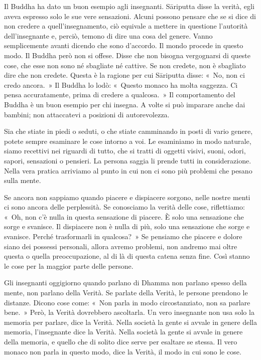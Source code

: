 Il Buddha ha dato un buon esempio agli insegnanti. Sāriputta disse la
verità, egli aveva espresso solo le sue vere sensazioni. Alcuni possono
pensare che se si dice di non credere a quell'insegnamento, ciò equivale
a mettere in questione l'autorità dell'insegnante e, perciò, temono di
dire una cosa del genere. Vanno semplicemente avanti dicendo che sono
d'accordo. Il mondo procede in questo modo. Il Buddha però non si
offese. Disse che non bisogna vergognarsi di queste cose, che esse non
sono né sbagliate né cattive. Se non credete, non è sbagliato dire che
non credete. Questa è la ragione per cui Sāriputta disse: «~No, non ci
credo ancora.~» Il Buddha lo lodò: «~Questo monaco ha molta saggezza. Ci
pensa accuratamente, prima di credere a qualcosa.~» Il comportamento del
Buddha è un buon esempio per chi insegna. A volte si può imparare anche
dai bambini; non attaccatevi a posizioni di autorevolezza.

Sia che stiate in piedi o seduti, o che stiate camminando in posti di
vario genere, potete sempre esaminare le cose intorno a voi. Le
esaminiamo in modo naturale, siamo recettivi nei riguardi di tutto, che
si tratti di oggetti visivi, suoni, odori, sapori, sensazioni o
pensieri. La persona saggia li prende tutti in considerazione. Nella
vera pratica arriviamo al punto in cui non ci sono più problemi che
pesano sulla mente.

Se ancora non sappiamo quando piacere e dispiacere sorgono, nelle nostre
menti ci sono ancora delle perplessità. Se conosciamo la verità delle
cose, riflettiamo: «~Oh, non c'è nulla in questa sensazione di piacere.
È solo una sensazione che sorge e svanisce. Il dispiacere non è nulla di
più, solo una sensazione che sorge e svanisce. Perché trasformarli in
qualcosa?~» Se pensiamo che piacere e dolore siano dei possessi
personali, allora avremo problemi, non andremo mai oltre questa o quella
preoccupazione, al di là di questa catena senza fine. Così stanno le
cose per la maggior parte delle persone.

Gli insegnanti oggigiorno quando parlano di Dhamma non parlano spesso
della mente, non parlano della Verità. Se parlate della Verità, le
persone prendono le distanze. Dicono cose come: «~Non parla in modo
circostanziato, non sa parlare bene.~» Però, la Verità dovrebbero
ascoltarla. Un vero insegnante non usa solo la memoria per parlare, dice
la Verità. Nella società la gente si avvale in genere della memoria,
l'insegnante dice la Verità. Nella società la gente si avvale in genere
della memoria, e quello che di solito dice serve per esaltare se stessa.
Il vero monaco non parla in questo modo, dice la Verità, il modo in cui
sono le cose.


